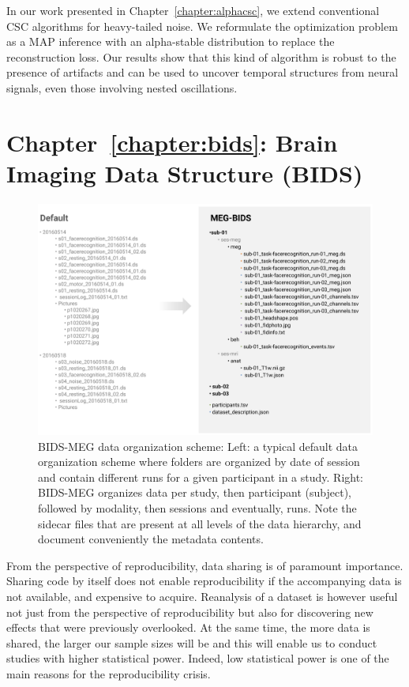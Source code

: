 In our work presented in Chapter~\ref{chapter:alphacsc}, we extend conventional \ac{CSC} algorithms for heavy-tailed noise. We reformulate the optimization problem as a \ac{MAP} inference with an alpha-stable distribution to replace the reconstruction loss. Our results show that this kind of algorithm is robust to the presence of artifacts and can be used to uncover temporal structures from neural signals, even those involving nested oscillations.

\section*{Chapter~\ref{chapter:bids}: Brain Imaging Data Structure (BIDS)}

\begin{figure}[htb!]
\begin{center}
   \includegraphics[width=\linewidth]{figures/bids_organization.png}
\end{center}
   \caption[]{BIDS-MEG data organization scheme: Left: a typical default data organization scheme where folders are organized by date of session and contain different runs for a given participant in a study. Right: BIDS-MEG organizes data per study, then participant (subject), followed by modality, then sessions and eventually, runs. Note the sidecar files that are present at all levels of the data hierarchy, and document conveniently the metadata contents.}
   \label{fig:sommaire:BIDS-MEG-organization}
\end{figure}
From the perspective of reproducibility, data sharing is of paramount importance. Sharing code by itself does not enable reproducibility if the accompanying data is not available, and expensive to acquire. Reanalysis of a dataset is however useful not just from the perspective of reproducibility but also for discovering new effects that were previously overlooked. At the same time, the more data is shared, the larger our sample sizes will be and this will enable us to conduct studies with higher statistical power. Indeed, low statistical power is one of the main reasons for the reproducibility crisis.

